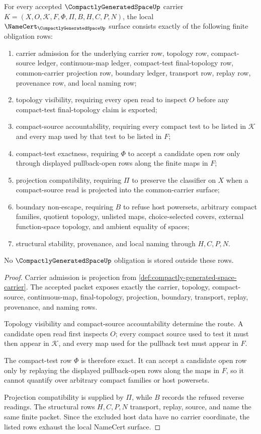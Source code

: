 \begin{theorem}\label{thm:compactly-generated-space-namecert-obligations}
For every accepted $\CompactlyGeneratedSpaceUp$ carrier $K=(X,O,\mathcal K,F,\Phi,\Pi,B,H,C,P,N)$, the local $\NameCert_{\CompactlyGeneratedSpaceUp}$ surface consists exactly of the following finite obligation rows:
\begin{enumerate}
\item carrier admission for the underlying carrier row, topology row, compact-source ledger, continuous-map ledger, compact-test final-topology row, common-carrier projection row, boundary ledger, transport row, replay row, provenance row, and local naming row;
\item topology visibility, requiring every open read to inspect $O$ before any compact-test final-topology claim is exported;
\item compact-source accountability, requiring every compact test to be listed in $\mathcal K$ and every map used by that test to be listed in $F$;
\item compact-test exactness, requiring $\Phi$ to accept a candidate open row only through displayed pullback-open rows along the finite maps in $F$;
\item projection compatibility, requiring $\Pi$ to preserve the classifier on $X$ when a compact-source read is projected into the common-carrier surface;
\item boundary non-escape, requiring $B$ to refuse host powersets, arbitrary compact families, quotient topology, unlisted maps, choice-selected covers, external function-space topology, and ambient equality of spaces;
\item structural stability, provenance, and local naming through $H,C,P,N$.
\end{enumerate}
No $\CompactlyGeneratedSpaceUp$ obligation is stored outside these rows.
\end{theorem}
\begin{proof}
Carrier admission is projection from \autoref{def:compactly-generated-space-carrier}. The accepted packet exposes exactly the carrier, topology, compact-source, continuous-map, final-topology, projection, boundary, transport, replay, provenance, and naming rows.

Topology visibility and compact-source accountability determine the route. A candidate open read first inspects $O$; every compact source used to test it must then appear in $\mathcal K$, and every map used for the pullback test must appear in $F$.

The compact-test row $\Phi$ is therefore exact. It can accept a candidate open row only by replaying the displayed pullback-open rows along the maps in $F$, so it cannot quantify over arbitrary compact families or host powersets.

Projection compatibility is supplied by $\Pi$, while $B$ records the refused reverse readings. The structural rows $H,C,P,N$ transport, replay, source, and name the same finite packet. Since the excluded host data have no carrier coordinate, the listed rows exhaust the local NameCert surface.
\end{proof}

